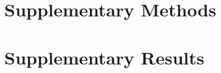 \documentclass[
  10,
]{article}
\author{}
\date{\vspace{-2.5em}}
\begin{document}
\tableofcontents

\listoftables

\listoffigures

\hypertarget{supplementary-methods}{%
\section{Supplementary Methods}\label{supplementary-methods}}

\hypertarget{supplementary-results}{%
\section{Supplementary Results}\label{supplementary-results}}
\end{document}
